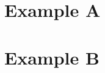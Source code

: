 \documentclass[12pt,twoside]{report}
\begin{document}


%
%




\nocite{*}




\begin{appendices}
\chapter{Example  A}\label{app:app1}
\Blindtext
\chapter{Example B} \label{app:app2}
\Blindtext
\end{appendices}
\end{document}

